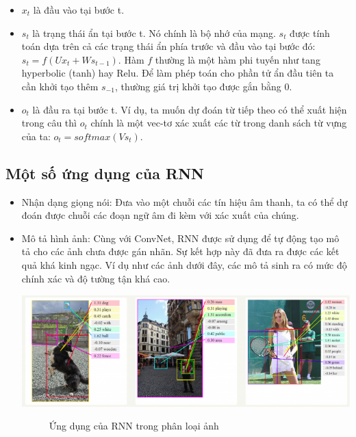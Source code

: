 \begin{itemize}
    \item $x_{t}$ là đầu vào tại bước t.
    \item $s_{t}$ là trạng thái ẩn tại bước t. Nó chính là bộ nhớ của mạng. $s_{t}$ được tính toán dựa trên cả các trạng thái ẩn phía trước và đầu vào tại bước đó: $s_{t} = f(Ux_{t}+Ws_{t-1})$. Hàm $f$ thường là một hàm phi tuyến như tang hyperbolic (tanh) hay Relu. Để làm phép toán cho phần tử ẩn đầu tiên ta cần khởi tạo thêm $s_{-1}$, thường giá trị khởi tạo được gắn bằng 0.
    \item $o_{t}$ là đầu ra tại bước t. Ví dụ, ta muốn dự đoán từ tiếp theo có thể xuất hiện trong câu thì $o_{t}$ chính là một vec-tơ xác xuất các từ trong danh sách từ vựng của ta: $o_{t} = softmax(Vs_{t})$. 
\end{itemize}


\subsection{Một số ứng dụng của RNN}
\begin{itemize}
    \item Nhận dạng giọng nói: Đưa vào một chuỗi các tín hiệu âm thanh, ta có thể dự đoán được chuỗi các đoạn ngữ âm đi kèm với xác xuất của chúng.
    \item Mô tả hình ảnh: Cùng với ConvNet, RNN được sử dụng để tự động tạo mô tả cho các ảnh chưa được gán nhãn. Sự kết hợp này đã đưa ra được các kết quả khá kinh ngạc. Ví dụ như các ảnh dưới đây, các mô tả sinh ra có mức độ chính xác và độ tường tận khá cao.
    \begin{center}
    \includegraphics[scale=.4]{image/chapter6/RNN-application.png}
    \begin{figure}[htp]
    \begin{center}
    \end{center}
    \caption{Ứng dụng của RNN trong phân loại ảnh \cite{rnn-basic}}
    \end{figure}
    \end{center}
\end{itemize}


